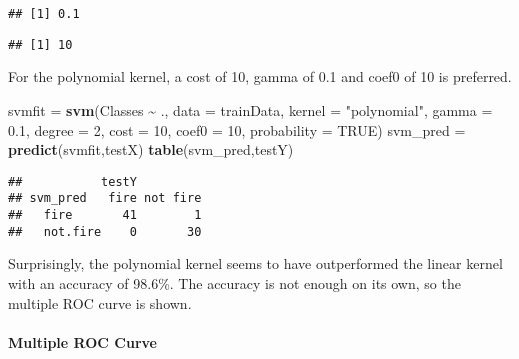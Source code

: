 \documentclass[
]{article}
\newenvironment{Shaded}{\begin{snugshade}}{\end{snugshade}}
\newcommand{\AttributeTok}[1]{\textcolor[rgb]{0.13,0.29,0.53}{#1}}
\newcommand{\ConstantTok}[1]{\textcolor[rgb]{0.56,0.35,0.01}{#1}}
\newcommand{\DecValTok}[1]{\textcolor[rgb]{0.00,0.00,0.81}{#1}}
\newcommand{\FloatTok}[1]{\textcolor[rgb]{0.00,0.00,0.81}{#1}}
\newcommand{\FunctionTok}[1]{\textcolor[rgb]{0.13,0.29,0.53}{\textbf{#1}}}
\newcommand{\NormalTok}[1]{#1}
\newcommand{\OtherTok}[1]{\textcolor[rgb]{0.56,0.35,0.01}{#1}}
\newcommand{\SpecialCharTok}[1]{\textcolor[rgb]{0.81,0.36,0.00}{\textbf{#1}}}
\newcommand{\StringTok}[1]{\textcolor[rgb]{0.31,0.60,0.02}{#1}}
\begin{document}
\begin{verbatim}
## [1] 0.1
\end{verbatim}

\begin{Shaded}
\end{Shaded}

\begin{verbatim}
## [1] 10
\end{verbatim}

For the polynomial kernel, a cost of 10, gamma of 0.1 and coef0 of 10 is
preferred.

\begin{Shaded}
\begin{Highlighting}[]
\NormalTok{svmfit }\OtherTok{=} \FunctionTok{svm}\NormalTok{(Classes }\SpecialCharTok{\textasciitilde{}}\NormalTok{ ., }\AttributeTok{data =}\NormalTok{ trainData, }\AttributeTok{kernel =} \StringTok{"polynomial"}\NormalTok{, }\AttributeTok{gamma =} \FloatTok{0.1}\NormalTok{, }\AttributeTok{degree =} \DecValTok{2}\NormalTok{, }\AttributeTok{cost =} \DecValTok{10}\NormalTok{, }\AttributeTok{coef0 =} \DecValTok{10}\NormalTok{, }\AttributeTok{probability =} \ConstantTok{TRUE}\NormalTok{)}
\NormalTok{svm\_pred }\OtherTok{=} \FunctionTok{predict}\NormalTok{(svmfit,testX)}
\FunctionTok{table}\NormalTok{(svm\_pred,testY)}
\end{Highlighting}
\end{Shaded}

\begin{verbatim}
##           testY
## svm_pred   fire not fire
##   fire       41        1
##   not.fire    0       30
\end{verbatim}

Surprisingly, the polynomial kernel seems to have outperformed the
linear kernel with an accuracy of 98.6\%. The accuracy is not enough on
its own, so the multiple ROC curve is shown.

\paragraph{Multiple ROC Curve}\label{multiple-roc-curve-9}
\end{document}
